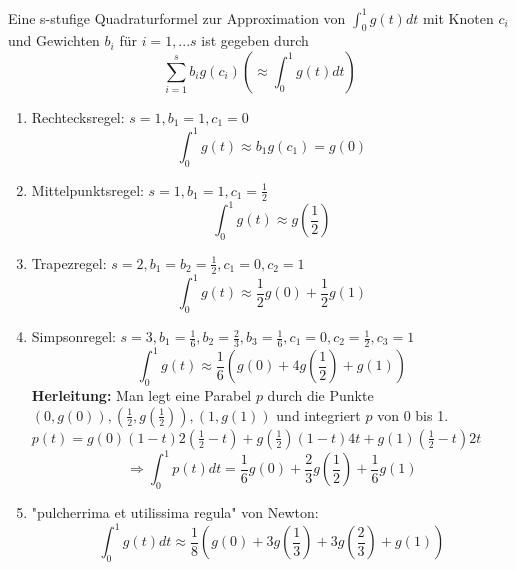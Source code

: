 \begin{definition}[Quadraturformel]
Eine s-stufige Quadraturformel zur Approximation von $\int_0^1 g(t)dt$ mit Knoten $c_i$ und Gewichten $b_i$ für $i=1,...s$ ist gegeben durch 
$$\sum_{i=1}^s b_i g(c_i) \left( \approx \int_0^1 g(t) dt\right)$$

\end{definition}

\begin{example}\leavevmode
\begin{enumerate}
  \item Rechtecksregel: $s = 1, b_1 = 1, c_1 = 0$
    $$ \int_0^1 g(t) \approx b_1 g(c_1) = g(0)$$
  \item Mittelpunktsregel: $s = 1, b_1 = 1, c_1 = \frac{1}{2}$
    $$ \int_0^1 g(t) \approx g(\frac{1}{2})$$
  \item Trapezregel: $s=2, b_1=b_2= \frac{1}{2}, c_1 = 0, c_2 = 1$
    $$ \int_0^1 g(t) \approx \frac{1}{2} g(0) + \frac{1}{2}g(1)$$
  \item Simpsonregel: $s=3, b_1 =  \frac{1}{6}, b_2 =  \frac{2}{3}, b_3 =  \frac{1}{6}, c_1 = 0, c_2 =  \frac{1}{2}, c_3 = 1$
    $$ \int_0^1 g(t) \approx \frac{1}{6} \left(g(0) + 4g\left(\frac{1}{2}\right) +g(1)\right)$$ 
    \textbf{Herleitung:} Man legt eine Parabel $p$ durch die Punkte $(0, g(0)), (\frac{1}{2}, g(\frac{1}{2})), (1, g(1))$ und integriert $p$ von 0 bis 1. \\
    $p(t) = g(0)(1-t)2(\frac{1}{2}-t) + g(\frac{1}{2})(1-t)4t + g(1)(\frac{1}{2}-t)2t$ \\
    $$\Rightarrow \int_0^1 p(t)dt = \frac{1}{6}g(0)+ \frac{2}{3}g(\frac{1}{2}) +\frac{1}{6}g(1)$$ 
  \item "pulcherrima et utilissima regula" von Newton:
    $$\int_0^1 g(t) dt \approx \frac{1}{8}\left(g(0) + 3g(\frac{1}{3}) + 3g(\frac{2}{3}) + g(1)\right)$$
\end{enumerate}

\end{example}

